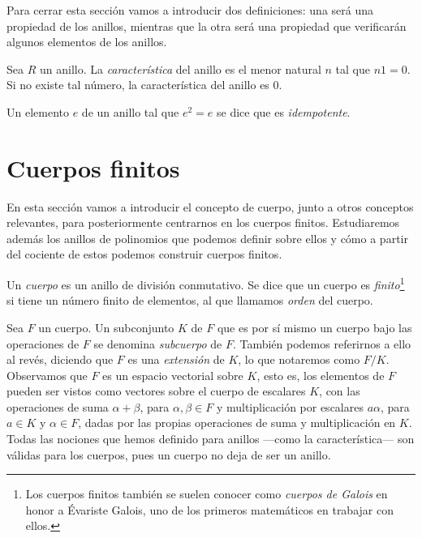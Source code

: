 Para cerrar esta sección vamos a introducir dos definiciones: una será una propiedad de los anillos, mientras que la otra será una propiedad que verificarán algunos elementos de los anillos.

\begin{definition}
  Sea \(R\) un anillo. La \textit{característica} del anillo es el menor natural \(n\) tal que \(n1 = 0\).
  Si no existe tal número, la característica del anillo es \(0\).  
\end{definition}

\begin{definition}
  Un elemento \(e\) de un anillo tal que \(e^2 = e\) se dice que es \textit{idempotente}.
\end{definition}

\section{Cuerpos finitos}

En esta sección vamos a introducir el concepto de cuerpo, junto a otros conceptos relevantes, para posteriormente centrarnos en los cuerpos finitos.
Estudiaremos además los anillos de polinomios que podemos definir sobre ellos y cómo a partir del cociente de estos podemos construir cuerpos finitos.

\begin{definition}
  Un \textit{cuerpo} es un anillo de división conmutativo.
  Se dice que un cuerpo es \textit{finito}\footnote{Los cuerpos finitos también se suelen conocer como \textit{cuerpos de Galois} en honor a Évariste Galois, uno de los primeros matemáticos en trabajar con ellos.} si tiene un número finito de elementos, al que llamamos \textit{orden} del cuerpo.
\end{definition}


Sea \(F\) un cuerpo. Un subconjunto \(K\) de \(F\) que es por sí mismo un cuerpo bajo las operaciones de \(F\) se denomina \textit{subcuerpo} de \(F\).
También podemos referirnos a ello al revés, diciendo que \(F\) es una \textit{extensión} de \(K\), lo que notaremos como \(F/K\).
Observamos que \(F\) es un espacio vectorial sobre \(K\), esto es, los elementos de \(F\) pueden ser vistos como vectores sobre el cuerpo de escalares \(K\), con las operaciones de suma \(\alpha + \beta\), para \(\alpha, \beta \in F\) y multiplicación por escalares \(a\alpha\), para \(a \in K\) y \(\alpha \in F\), dadas por las propias operaciones de suma y multiplicación en \(K\).
Todas las nociones que hemos definido para anillos —como la característica— son válidas para los cuerpos, pues un cuerpo no deja de ser un anillo.

